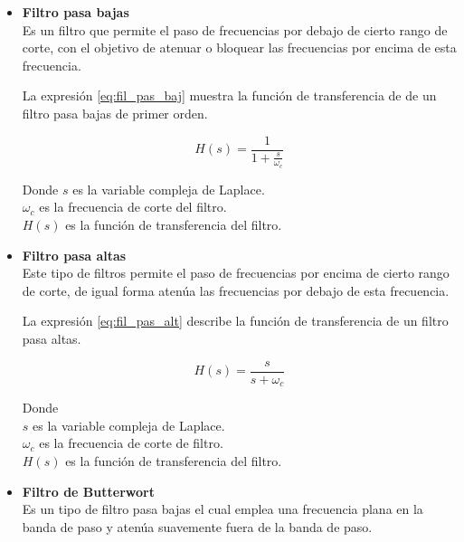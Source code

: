     \begin{itemize}
        \item \textbf{Filtro pasa bajas}\\
        Es un filtro que permite el paso de frecuencias por debajo de cierto rango de corte, con el objetivo de atenuar o bloquear las frecuencias por encima de esta frecuencia.

        La expresión \ref{eq:fil_pas_baj} muestra la función de transferencia de de un filtro pasa bajas de primer orden.

        \begin{equation}
            H(s) = \frac{1}{1 + \frac{s}{\omega_c}}
            \label{eq:fil_pas_baj}
        \end{equation}

        Donde
        \noindent
        $s$ es la variable compleja de Laplace.\\
        $\omega_c$ es la frecuencia de corte del filtro.\\
        $H(s)$ es la función de transferencia del filtro.\\

        \item \textbf{Filtro pasa altas}\\
        Este tipo de filtros permite el paso de frecuencias por encima de cierto rango de corte, de igual forma atenúa las frecuencias por debajo de esta frecuencia.

        La expresión \ref{eq:fil_pas_alt} describe la función de transferencia de un filtro pasa altas.

        \begin{equation}
            H(s) = \frac{s}{s + \omega_c}
            \label{eq:fil_pas_alt}
        \end{equation}
        
        Donde\\
        \noindent
        $s$ es la variable compleja de Laplace.\\
        $\omega_c$ es la frecuencia de corte de filtro.\\
        $H(s)$ es la función de transferencia del filtro.\\

        \item \textbf{Filtro de Butterwort}\\
        Es un tipo de filtro pasa bajas el cual emplea una frecuencia plana en la banda de paso y atenúa suavemente fuera de la banda de paso.


\end{itemize}
